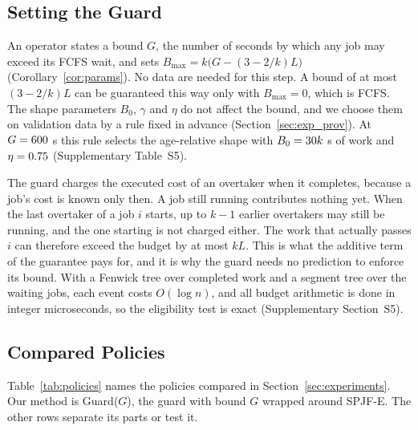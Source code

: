 

\subsection{Setting the Guard}

An operator states a bound $G$, the number of seconds by which any job may exceed its FCFS
wait, and sets $B_{\max} = k\bigl(G - (3 - 2/k)L\bigr)$ (Corollary~\ref{cor:params}). No
data are needed for this step. A bound of at most $(3-2/k)L$ can be guaranteed this way only
with $B_{\max} = 0$, which is FCFS. The shape parameters $B_0$, $\gamma$ and $\eta$ do not
affect the bound, and we choose them on validation data by a rule fixed in advance
(Section~\ref{sec:exp_prov}). At $G = 600$ s this rule selects the age-relative
shape with $B_0 = 30k$ s of work and $\eta = 0.75$ (Supplementary
Table~S5).

The guard charges the executed cost of an overtaker when it completes, because a job's cost
is known only then. A job still running contributes nothing yet. When the last overtaker of
a job $i$ starts, up to $k-1$ earlier overtakers may still be running, and the one starting
is not charged either. The work that actually passes $i$ can therefore exceed the budget by
at most $kL$. This is what the additive term of the guarantee pays for, and it is why
the guard needs no prediction to enforce its bound. With a Fenwick tree over completed work
and a segment tree over the waiting jobs, each event costs $O(\log n)$, and all budget
arithmetic is done in integer microseconds, so the eligibility test is exact
(Supplementary Section~S5).

\subsection{Compared Policies}

Table~\ref{tab:policies} names the policies compared in Section~\ref{sec:experiments}. Our
method is Guard($G$), the guard with bound $G$ wrapped around SPJF-E. The other rows
separate its parts or test it.

